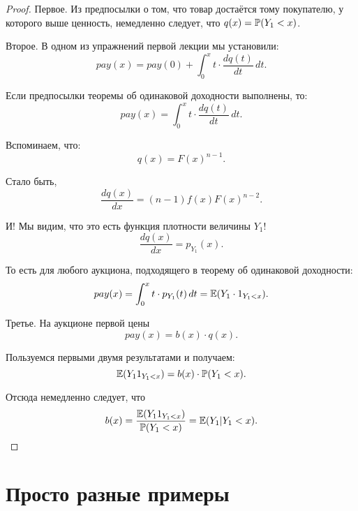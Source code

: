 \begin{proof}

Первое. Из предпосылки о том, что товар достаётся тому покупателю, у которого выше ценность, немедленно следует, что $ q(x)=\P(Y_{1}<x) $.

Второе. В одном из упражнений первой лекции мы установили:
\begin{equation}
pay(x)=pay(0)+\int_{0}^{x}t \cdot \frac{dq(t)}{dt} \, dt.
\end{equation}

Если предпосылки теоремы об одинаковой доходности выполнены, то:
\begin{equation}
pay(x)=\int_{0}^{x}t \cdot \frac{dq(t)}{dt} \, dt.
\end{equation}


Вспоминаем, что:
\begin{equation}
q(x)=F(x)^{n-1}.
\end{equation}

Стало быть,
\begin{equation}
\frac{dq(x)}{dx}=(n-1)f(x)F(x)^{n-2}.
\end{equation}

И! Мы видим, что это есть функция плотности величины $ Y_{1} $!
\begin{equation}
\frac{dq(x)}{dx}=p_{Y_{1}}(x).
\end{equation}

То есть для любого аукциона, подходящего в теорему об одинаковой доходности:
\begin{equation}
pay(x)=\int_{0}^{x}t \cdot p_{Y_{1}}(t) \, dt=\E(Y_{1}\cdot 1_{Y_{1}<x}).
\end{equation}



Третье. На аукционе первой цены
\begin{equation}
pay(x)=b(x)\cdot q(x).
\end{equation}

Пользуемся первыми двумя результатами и получаем:
\begin{equation}
\E(Y_{1}1_{Y_{1}<x})=b(x)\cdot \P(Y_{1}<x).
\end{equation}

Отсюда немедленно следует, что
\begin{equation}
b(x)=\frac{\E(Y_{1}1_{Y_{1}<x})}{\P(Y_{1}<x)}=\E(Y_{1}|Y_{1}<x).
\end{equation}

\end{proof}


\section{Просто разные примеры}


